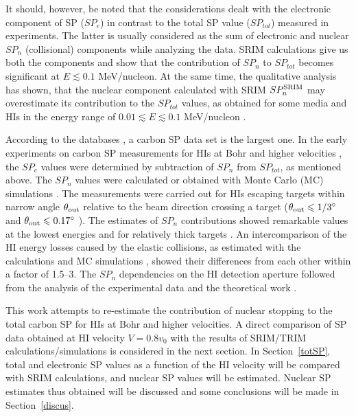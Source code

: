 \documentclass[aps,pra,twocolumn,amsmath,amssymb,floatfix]{revtex4-2}
\begin{document}
It should, however, be noted that the considerations \cite{Paul2003,Paul2010,Paul2013,IAEASP} dealt with the electronic component of SP ($SP_{e}$) in contrast to the total SP value ($SP_{tot}$) measured in experiments. The latter is usually considered as the sum of electronic and nuclear $SP_{n}$ (collisional) components while analyzing the data. SRIM calculations give us both the components and show that the contribution of $SP_{n}$ to $SP_{tot}$ becomes significant at $E \lesssim 0.1$ MeV/nucleon. At the same time, the qualitative analysis \cite{Paul13AIP} has shown, that the nuclear component calculated with SRIM $SP_{n}^{\rm SRIM}$ may overestimate its contribution to the $SP_{tot}$ values, as obtained for some media and HIs in the energy range of  $0.01 \lesssim E \lesssim 0.1$ MeV/nucleon \cite{Zhang2002,Barb2010}.

According to the databases \cite{SRIM,IAEASP}, a carbon SP data set is the largest one. In the early experiments on carbon SP measurements for HIs at Bohr \cite{Fastrup66,Hvelp68,Lennard86} and higher velocities \cite{BrownMoak72}, the $SP_{e}$ values were determined by subtraction of  $SP_{n}$ from $SP_{tot}$, as mentioned above. The $SP_{n}$ values were calculated \cite{Fastrup66,Hvelp68} or obtained with Monte Carlo (MC) simulations \cite{Lennard86}. The measurements were carried out for HIs escaping  targets within narrow angle $\theta_{\rm out}$ relative to the beam direction crossing a target ($\theta_{\rm out}\leqslant 1/3^{\circ}$ \cite{Fastrup66,Hvelp68} and $\theta_{\rm out}\leqslant 0.17^{\circ}$ \cite{Lennard86}). The estimates of $SP_{n}$ contributions showed remarkable values at the lowest energies \cite{Fastrup66,Hvelp68} and for relatively thick targets \cite{Lennard86}. An intercomparison of the HI energy losses caused by the elastic collisions, as estimated with the calculations \cite{Fastrup66} and MC simulations \cite{Lennard86,Krist84}, showed their differences from each other within a factor of 1.5--3. The $SP_{n}$ dependencies on the HI detection aperture followed from the analysis of the experimental data \cite{Garnir80} and the theoretical work \cite{Krist84}.

This work attempts to re-estimate the contribution of nuclear stopping to the total carbon SP for HIs at Bohr and higher velocities. A direct comparison of SP data obtained at HI velocity $V = 0.8 v_{0}$ with the results of SRIM/TRIM calculations/simulations is considered in the next section. In Section~\ref{totSP}, total and electronic SP values as a function of the HI velocity will be compared with SRIM calculations, and nuclear SP values will be estimated. Nuclear SP estimates thus obtained will be discussed and some conclusions will be made in Section~\ref{discus}.
\end{document}

